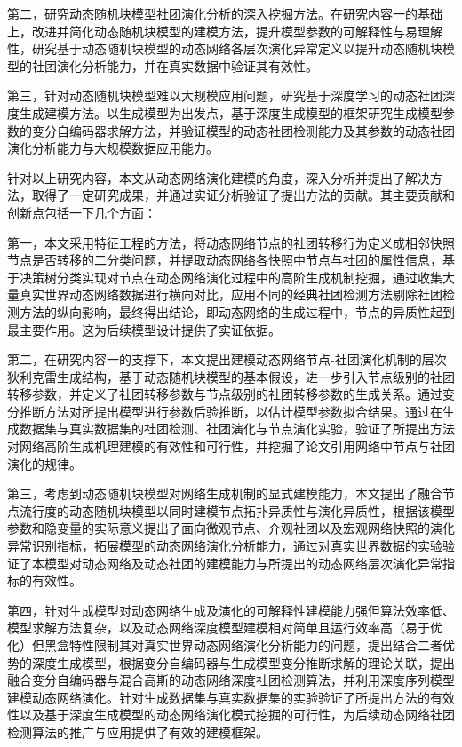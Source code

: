 第二，研究动态随机块模型社团演化分析的深入挖掘方法。在研究内容一的基础上，改进并简化动态随机块模型的建模方法，提升模型参数的可解释性与易理解性，研究基于动态随机块模型的动态网络各层次演化异常定义以提升动态随机块模型的社团演化分析能力，并在真实数据中验证其有效性。

第三，针对动态随机块模型难以大规模应用问题，研究基于深度学习的动态社团深度生成建模方法。以生成模型为出发点，基于深度生成模型的框架研究生成模型参数的变分自编码器求解方法，并验证模型的动态社团检测能力及其参数的动态社团演化分析能力与大规模数据应用能力。

针对以上研究内容，本文从动态网络演化建模的角度，深入分析并提出了解决方法，取得了一定研究成果，并通过实证分析验证了提出方法的贡献。其主要贡献和创新点包括一下几个方面：

第一，本文采用特征工程的方法，将动态网络节点的社团转移行为定义成相邻快照节点是否转移的二分类问题，并提取动态网络各快照中节点与社团的属性信息，基于决策树分类实现对节点在动态网络演化过程中的高阶生成机制挖掘，通过收集大量真实世界动态网络数据进行横向对比，应用不同的经典社团检测方法剔除社团检测方法的纵向影响，最终得出结论，即动态网络的生成过程中，节点的异质性起到最主要作用。这为后续模型设计提供了实证依据。

第二，在研究内容一的支撑下，本文提出建模动态网络节点-社团演化机制的层次狄利克雷生成结构，基于动态随机块模型的基本假设，进一步引入节点级别的社团转移参数，并定义了社团转移参数与节点级别的社团转移参数的生成关系。通过变分推断方法对所提出模型进行参数后验推断，以估计模型参数拟合结果。通过在生成数据集与真实数据集的社团检测、社团演化与节点演化实验，验证了所提出方法对网络高阶生成机理建模的有效性和可行性，并挖掘了论文引用网络中节点与社团演化的规律。

第三，考虑到动态随机块模型对网络生成机制的显式建模能力，本文提出了融合节点流行度的动态随机块模型以同时建模节点拓扑异质性与演化异质性，根据该模型参数和隐变量的实际意义提出了面向微观节点、介观社团以及宏观网络快照的演化异常识别指标，拓展模型的动态网络演化分析能力，通过对真实世界数据的实验验证了本模型对动态网络及动态社团的建模能力与所提出的动态网络层次演化异常指标的有效性。

第四，针对生成模型对动态网络生成及演化的可解释性建模能力强但算法效率低、模型求解方法复杂，以及动态网络深度模型建模相对简单且运行效率高（易于优化）但黑盒特性限制其对真实世界动态网络演化分析能力的问题，提出结合二者优势的深度生成模型，根据变分自编码器与生成模型变分推断求解的理论关联，提出融合变分自编码器与混合高斯的动态网络深度社团检测算法，并利用深度序列模型建模动态网络演化。针对生成数据集与真实数据集的实验验证了所提出方法的有效性以及基于深度生成模型的动态网络演化模式挖掘的可行性，为后续动态网络社团检测算法的推广与应用提供了有效的建模框架。

